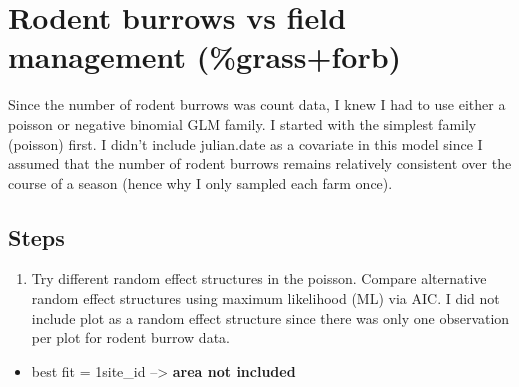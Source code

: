 \documentclass[
]{article}
\providecommand{\tightlist}{%
  \setlength{\itemsep}{0pt}\setlength{\parskip}{0pt}}
\begin{document}
\section{Rodent burrows vs field management
(\%grass+forb)}\label{rodent-burrows-vs-field-management-grassforb}

Since the number of rodent burrows was count data, I knew I had to use
either a poisson or negative binomial GLM family. I started with the
simplest family (poisson) first. I didn't include julian.date as a
covariate in this model since I assumed that the number of rodent
burrows remains relatively consistent over the course of a season (hence
why I only sampled each farm once).

\subsection{Steps}\label{steps}

\begin{enumerate}
\def\labelenumi{\arabic{enumi})}
\tightlist
\item
  Try different random effect structures in the poisson. Compare
  alternative random effect structures using maximum likelihood (ML) via
  AIC. I did not include plot as a random effect structure since there
  was only one observation per plot for rodent burrow data.
\end{enumerate}

\begin{itemize}
\tightlist
\item
  best fit = 1\textbar site\_id --\textgreater{} \textbf{area not
  included}
\end{itemize}
\end{document}
